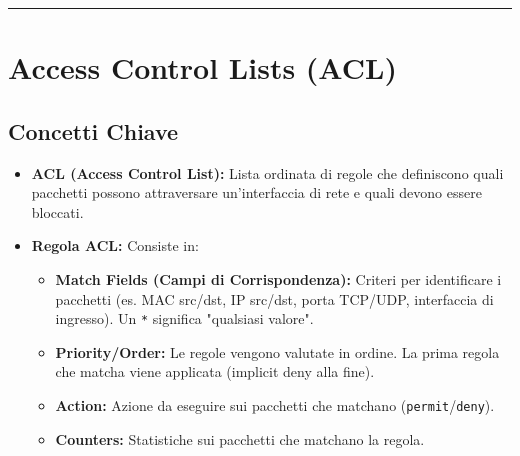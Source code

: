\hrule %

\section{Access Control Lists (ACL)}
\label{sec:acl}

\subsection{Concetti Chiave}
\begin{itemize}
    \item \textbf{ACL (Access Control List):} Lista ordinata di regole che definiscono quali pacchetti possono attraversare un'interfaccia di rete e quali devono essere bloccati.
    \item \textbf{Regola ACL:} Consiste in:
    \begin{itemize}
        \item \textbf{Match Fields (Campi di Corrispondenza):} Criteri per identificare i pacchetti (es. MAC src/dst, IP src/dst, porta TCP/UDP, interfaccia di ingresso). Un \texttt{*} significa "qualsiasi valore".
        \item \textbf{Priority/Order:} Le regole vengono valutate in ordine. La prima regola che matcha viene applicata (implicit deny alla fine).
        \item \textbf{Action:} Azione da eseguire sui pacchetti che matchano (\texttt{permit}/\texttt{deny}).
        \item \textbf{Counters:} Statistiche sui pacchetti che matchano la regola.
    \end{itemize}
\end{itemize}

